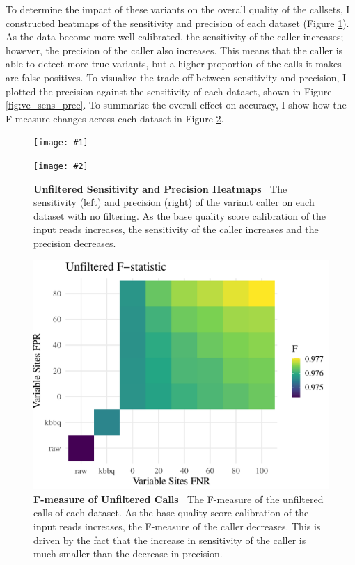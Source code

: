 \documentclass{report}
\newcommand{\titlecaption}[2]{\caption[#1]{\textbf{#1 \textbar\,} #2}}
\newcommand{\includetwo}[2]{\begin{minipage}{.475\textwidth}%
\texttt{[image: \#1]}%
\end{minipage}\hfill\begin{minipage}{.475\textwidth}%
\texttt{[image: \#2]}%
\end{minipage}}
\begin{document}
\begin{outline}
\item To determine the impact of these variants on the overall quality of the callsets, I constructed heatmaps of the sensitivity and precision of each dataset (Figure \ref{fig:vc_sens_prech}). As the data become more well-calibrated, the sensitivity of the caller increases; however, the precision of the caller also increases. This means that the caller is able to detect more true variants, but a higher proportion of the calls it makes are false positives. To visualize the trade-off between sensitivity and precision, I plotted the precision against the sensitivity of each dataset, shown in Figure \ref{fig:vc_sens_prec}. To summarize the overall effect on accuracy, I show how the F-measure changes across each dataset in Figure \ref{fig:vc_f_heatmap}.
\end{outline}


\begin{figure}
\centering
\includetwo{sensitivity.pdf}{precision.pdf}
\titlecaption{Unfiltered Sensitivity and Precision Heatmaps}{The sensitivity (left) and precision (right) of the variant caller on each dataset with no filtering. As the base quality score calibration of the input reads increases, the sensitivity of the caller increases and the precision decreases.}
\label{fig:vc_sens_prech}
\end{figure}


\begin{figure}
\centering
\includegraphics[width = .8\textwidth]{f_heatmap.pdf}
\titlecaption{F-measure of Unfiltered Calls}{The F-measure of the unfiltered calls of each dataset. As the base quality score calibration of the input reads increases, the F-measure of the caller decreases. This is driven by the fact that the increase in sensitivity of the caller is much smaller than the decrease in precision.}
\label{fig:vc_f_heatmap}
\end{figure}
\end{document}

